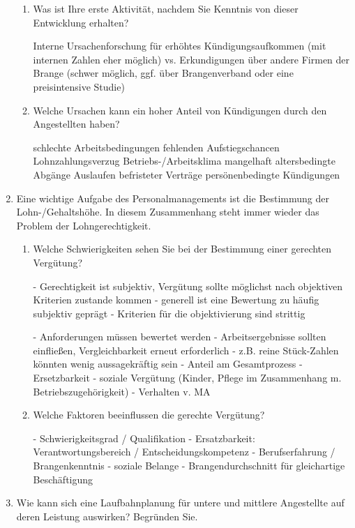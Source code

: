 \documentclass[12pt,a4paper]{scrreprt}
\begin{document}
\begin{enumerate}
\begin{enumerate}

\item Was ist Ihre erste Aktivität, nachdem Sie Kenntnis von dieser Entwicklung erhalten?

Interne Ursachenforschung für erhöhtes Kündigungsaufkommen (mit internen Zahlen eher möglich)
vs.
Erkundigungen über andere Firmen der Brange (schwer möglich, ggf. über Brangenverband oder eine preisintensive Studie)

\item Welche Ursachen kann ein hoher Anteil von Kündigungen durch den Angestellten haben?

schlechte Arbeitsbedingungen
fehlenden Aufstiegschancen
Lohnzahlungsverzug
Betriebs-/Arbeitsklima mangelhaft
altersbedingte Abgänge
Auslaufen befristeter Verträge
persönenbedingte Kündigungen

\end{enumerate}

\item 
Eine wichtige Aufgabe des Personalmanagements ist die Bestimmung der Lohn-/Gehaltshöhe. In
diesem Zusammenhang steht immer wieder das Problem der Lohngerechtigkeit.

\begin{enumerate}
\item Welche Schwierigkeiten sehen Sie bei der Bestimmung einer gerechten Vergütung?

- Gerechtigkeit ist subjektiv, Vergütung sollte möglichst nach objektiven Kriterien zustande kommen
- generell ist eine Bewertung zu häufig subjektiv geprägt
- Kriterien für die objektivierung sind strittig

- Anforderungen müssen bewertet werden
- Arbeitsergebnisse sollten einfließen, Vergleichbarkeit erneut erforderlich - z.B. reine Stück-Zahlen könnten wenig aussagekräftig sein
- Anteil am Gesamtprozess
- Ersetzbarkeit
- soziale Vergütung (Kinder, Pflege im Zusammenhang m. Betriebszugehörigkeit)
- Verhalten v. MA

\item Welche Faktoren beeinflussen die gerechte Vergütung?

- Schwierigkeitsgrad / Qualifikation
- Ersatzbarkeit: Verantwortungsbereich / Entscheidungskompetenz
- Berufserfahrung / Brangenkenntnis
- soziale Belange
- Brangendurchschnitt für gleichartige Beschäftigung

\end{enumerate}

\item Wie kann sich eine Laufbahnplanung für untere und mittlere Angestellte auf deren Leistung auswirken? Begründen Sie.


\end{enumerate}
\end{document}
